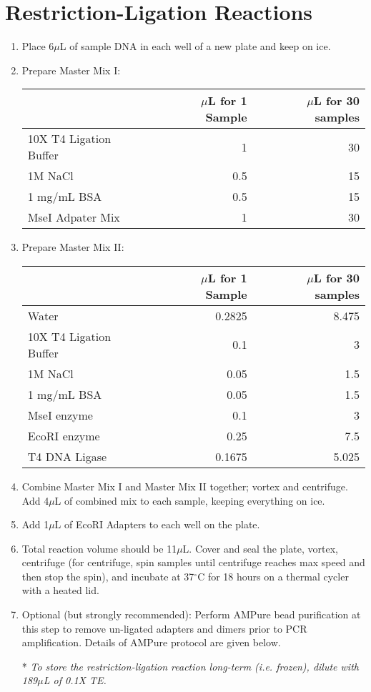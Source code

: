 \documentclass{article}
\begin{document}
\section{Restriction-Ligation Reactions}
\begin{enumerate}
	\item Place 6$\mu$L of sample DNA in each well of a new plate and keep on ice.
	\item Prepare Master Mix I:
	\begin{center}
	\begin{tabular}{l|r|r}
	\hline
	& $\mu$L for 1 Sample & $\mu$L for 30 samples \\
	\hline
	10X T4 Ligation Buffer & 1 & 30 \\
	1M NaCl	&	0.5	&	15 \\
	1 mg/mL BSA	&	0.5	&	15	\\
	MseI Adpater Mix	&	1	&	30\\
	\hline
	\end{tabular}
	\end{center}
	
	\item Prepare Master Mix II:
	\begin{center}
	\begin{tabular}{l|r|r}
	\hline
	& $\mu$L for 1 Sample & $\mu$L for 30 samples \\
	\hline
	Water & 0.2825 & 8.475 \\
	10X T4 Ligation Buffer	&	0.1	&	3 \\
	1M NaCl	&	0.05	&	1.5\\
	1 mg/mL BSA	&	0.05	&	1.5	\\
	MseI enzyme	&	0.1	&	3\\
	EcoRI enzyme	&	0.25	&	7.5\\
	T4 DNA Ligase	&	0.1675	&	5.025	\\
	\hline
	\end{tabular}
	\end{center}
	
	\item Combine Master Mix I and Master Mix II together; vortex and centrifuge.  Add 4$\mu$L of combined mix to each sample, keeping everything on ice.

	\item Add 1$\mu$L of EcoRI Adapters to each well on the plate.

	\item Total reaction volume should be 11$\mu$L.  Cover and seal the plate, vortex, centrifuge (for centrifuge, spin samples until centrifuge reaches max speed and then stop the spin), and incubate at 37$^{\circ}$C for 18 hours on a thermal cycler with a heated lid.  

	\item Optional (but strongly recommended): Perform AMPure bead purification at this step to remove un-ligated adapters and dimers prior to PCR amplification.  Details of AMPure protocol are given below.

	* \emph{To store the restriction-ligation reaction long-term (i.e. frozen), dilute with 189$\mu$L of 0.1X TE.} 

\end{enumerate}
\end{document}
